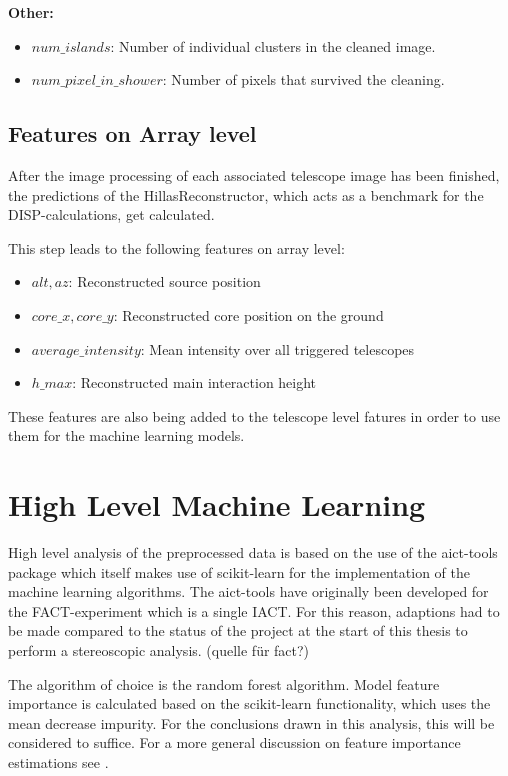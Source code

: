 \textbf{Other:}

\begin{itemize}
    \item{$num\_islands$: Number of individual clusters in the cleaned image.}
    \item{$num\_pixel\_in\_shower$: Number of pixels that survived the cleaning.}
\end{itemize}

\subsection{Features on Array level}  %
After the image processing of each associated telescope image has been finished,
the predictions of the
HillasReconstructor, which acts as a benchmark for the DISP-calculations, get calculated.

This step leads to the following features on array level:
\begin{itemize}
    \item{$alt, az$: Reconstructed source position}
    \item{$core\_x, core\_y$: Reconstructed core position on the ground}
    \item{$average\_intensity$: Mean intensity over all triggered telescopes}
    \item{$h\_max$: Reconstructed main interaction height}
\end{itemize}

These features are also being added to the telescope level fatures in order to
use them for the machine learning models.

\section{High Level Machine Learning}

High level analysis of the preprocessed data is based on the use of
the aict-tools package \cite{aict-tools} which itself makes use of
scikit-learn \cite{sklearn_api} for the implementation of the machine learning algorithms.
The aict-tools have originally been developed for the FACT-experiment
which is a single IACT. 
For this reason,
adaptions had to be made compared to the status of the project at the start 
of this thesis to perform a stereoscopic analysis. (quelle für fact?)

The algorithm of choice is the random forest algorithm.
Model feature importance is calculated
based on the scikit-learn functionality, which
uses the mean decrease impurity.
For the conclusions drawn in this analysis,
this will be considered to suffice.
For a more general discussion on feature importance estimations see \cite{hastie2017springer}.

